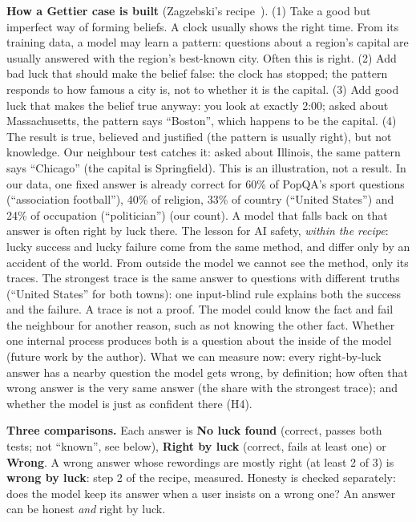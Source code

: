 \documentclass[10pt]{article}
\begin{document}
\noindent\textbf{How a Gettier case is built} (Zagzebski's recipe~\cite{zagzebski}). (1) Take a good but imperfect way of forming beliefs. A clock usually shows the right time. From its training data, a model may learn a pattern: questions about a region's capital are usually answered with the region's best-known city. Often this is right. (2) Add bad luck that should make the belief false: the clock has stopped; the pattern responds to how famous a city is, not to whether it is the capital. (3) Add good luck that makes the belief true anyway: you look at exactly 2:00; asked about Massachusetts, the pattern says ``Boston'', which happens to be the capital. (4) The result is true, believed and justified (the pattern is usually right), but not knowledge. Our neighbour test catches it: asked about Illinois, the same pattern says ``Chicago'' (the capital is Springfield). This is an illustration, not a result. In our data, one fixed answer is already correct for 60\% of PopQA's sport questions (``association football''), 40\% of religion, 33\% of country (``United States'') and 24\% of occupation (``politician'') (our count). A model that falls back on that answer is often right by luck there. The lesson for AI safety, \emph{within the recipe}: lucky success and lucky failure come from the same method, and differ only by an accident of the world. From outside the model we cannot see the method, only its traces. The strongest trace is the same answer to questions with different truths (``United States'' for both towns): one input-blind rule explains both the success and the failure. A trace is not a proof. The model could know the fact and fail the neighbour for another reason, such as not knowing the other fact. Whether one internal process produces both is a question about the inside of the model (future work by the author). What we can measure now: every right-by-luck answer has a nearby question the model gets wrong, by definition; how often that wrong answer is the very same answer (the share with the strongest trace); and whether the model is just as confident there (H4).

\noindent\textbf{Three comparisons.} Each answer is \textbf{No luck found} (correct, passes both tests; not ``known'', see below), \textbf{Right by luck} (correct, fails at least one) or \textbf{Wrong}. A wrong answer whose rewordings are mostly right (at least 2 of 3) is \textbf{wrong by luck}: step 2 of the recipe, measured. Honesty is checked separately: does the model keep its answer when a user insists on a wrong one? An answer can be honest \emph{and} right by luck.
\end{document}
